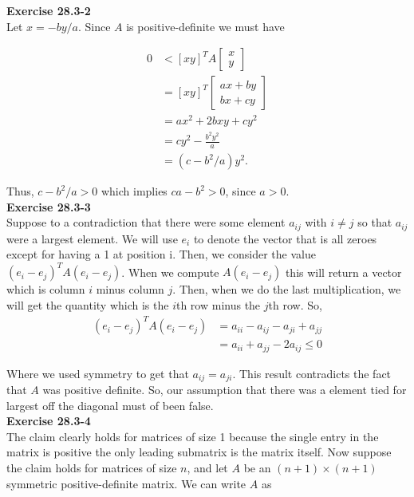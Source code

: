 \documentclass{article}
\begin{document}
\noindent\textbf{Exercise 28.3-2}\\

Let $x = -by/a$.  Since $A$ is positive-definite we must have 

\begin{align*}
0 & < [x y ]^T A  \left[ \begin{array}{c} x \\ y \end{array} \right] \\
&= [x y]^T \left[ \begin{array}{c} ax + by \\ bx + cy \end{array}\right] \\
&= ax^2 + 2bxy + cy^2 \\
&= cy^2 - \frac{b^2 y^2}{a} \\
&= (c-b^2/a)y^2.
\end{align*}

Thus, $c-b^2/a > 0$ which implies $ca - b^2 > 0$, since $a>0$.  \\

\noindent\textbf{Exercise 28.3-3}\\

Suppose to a contradiction that there were some element $a_{ij}$ with $i\neq j$ so that $a_{ij}$ were a largest element. We will use $e_i$ to denote the vector that is all zeroes except for having a 1 at position i. Then, we consider the value $(e_i-e_j)^T A (e_i-e_j)$. When we compute $A(e_i-e_j)$ this will return a vector which is column $i$ minus column $j$. Then, when we do the last multiplication, we will get the quantity which is the $i$th row minus the $j$th row. So, 
\begin{align*}
(e_i-e_j)^T A (e_i-e_j) &= a_{ii} - a_{ij} - a_{ji}  +a_{jj}\\
&=a_{ii} + a_{jj} - 2 a_{ij}\le0
\end{align*}

Where we used symmetry to get that $a_{ij} =a_{ji}$. This result contradicts the fact that $A$ was positive definite. So, our assumption that there was a element tied for largest off the diagonal must of been false.\\

\noindent\textbf{Exercise 28.3-4}\\

The claim clearly holds for matrices of size 1 because the single entry in the matrix is positive the only leading submatrix is the matrix itself.  Now suppose the claim holds for matrices of size $n$, and let $A$ be an $(n+1) \times (n+1)$ symmetric positive-definite matrix. We can write $A$ as 
\end{document}
